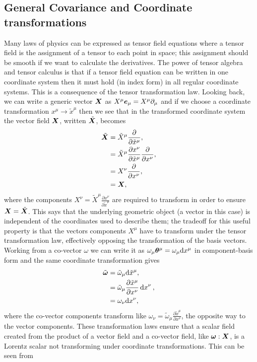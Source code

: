 \subsection{General Covariance and Coordinate transformations}\label{intro:sec:cov}
Many laws of physics can be expressed as tensor field equations where a tensor
field is the assignment of a tensor to each point in space;
this assignment should be smooth if we want to calculate the derivatives.
The power of tensor algebra and tensor calculus is that if a tensor field equation
can be written in one coordinate system then  it must hold (in index form) in all
regular coordinate systems. This is a consequence of the tensor transformation law.
Looking back, we can write a generic vector
$\boldsymbol{X}$ as $X^\mu \boldsymbol{e}_\mu = X^\mu \partial_\mu$ and if we choose a coordinate
transformation $x^\mu \rightarrow \tilde{x}^\mu$ then we see that in the transformed
coordinate system the vector field $\boldsymbol{X}$, written $\tilde{\boldsymbol{X}}$, becomes
\begin{align}
\tilde{\boldsymbol X} &= \tilde{X}^\mu\frac{\partial}{\partial \tilde{x}^\mu}, \\
              &= \tilde{X}^\mu\frac{\partial x^\nu}{\partial \tilde{x}^\mu}\frac{\partial}{\partial {x}^\nu}, \\
              &= X^\nu \frac{\partial}{\partial x^\nu}, \\
              &= \boldsymbol{X}, \
\end{align}
where the components $X^\nu = \tilde{X}^\mu\frac{\partial x^\nu}{\partial \tilde{x}^\mu}$ are required to transform in order to ensure $\boldsymbol{X}=\tilde{\boldsymbol{X}}$. This says that the underlying geometric object (a vector in this case) is independent of the coordinates used to describe them; the tradeoff for this useful property is that the vectors components $X^\mu$ have to transform under the tensor transformation law, effectively opposing the transformation of the basis vectors. Working from a co-vector $\omega$ we can write it as $\omega_\mu \boldsymbol{\theta}^\mu = \omega_\mu \dd x^\mu$ in component-basis form and the same coordinate transformation gives
\begin{align}
\tilde{\boldsymbol{\omega}} &= \tilde{\omega}_\mu \dd \tilde{x}^\mu , \\
                    &= \tilde{\omega}_\mu \frac{\partial \tilde{x}^\mu}{\partial x^\nu}\dd {x}^\nu , \\
                    &= \omega_\nu \dd x^\nu,
\end{align}
where the co-vector components transform like $\omega_\nu= \tilde{\omega}_\mu \frac{\partial \tilde{x}^\mu}{\partial x^\nu}$, the opposite way to the vector components. These transformation laws ensure that a scalar field created from the product of a vector field and a co-vector field, like $\boldsymbol{\omega}: \boldsymbol{X}$, is a Lorentz scalar not transforming under coordinate transformations. This can be seen from
